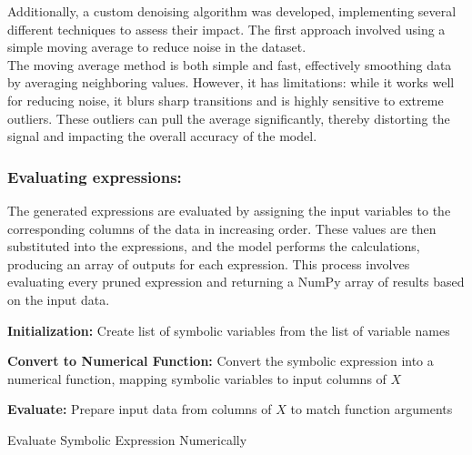 \documentclass{article}
\begin{document}
Additionally, a custom denoising algorithm was developed, implementing several different techniques to assess their impact. The first approach involved using a simple moving average to reduce noise in the dataset.\\

The moving average method is both simple and fast, effectively smoothing data by averaging neighboring values. However, it has limitations: while it works well for reducing noise, it blurs sharp transitions and is highly sensitive to extreme outliers. These outliers can pull the average significantly, thereby distorting the signal and impacting the overall accuracy of the model.\\


\subsubsection{Evaluating expressions:}

The generated expressions are evaluated by assigning the input variables to the corresponding columns of the data in increasing order. These values are then substituted into the expressions, and the model performs the calculations, producing an array of outputs for each expression. This process involves evaluating every pruned expression and returning a NumPy array of results based on the input data.\\




\begin{algorithm}[H]
\SetAlgoLined
{}

\textbf{Initialization:}\;
Create list of symbolic variables from the list of variable names\;

\textbf{Convert to Numerical Function:}\;
Convert the symbolic expression into a numerical function, mapping symbolic variables to input columns of \(X\)\;

\textbf{Evaluate:}\;
Prepare input data from columns of \(X\) to match function arguments\;

\caption{Evaluate Symbolic Expression Numerically}
\label{alg:evaluate_expression} %
\end{algorithm}\\
\end{document}
